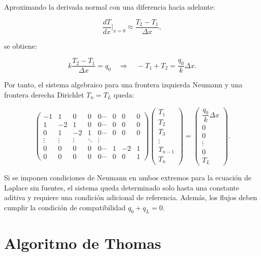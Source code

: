 \documentclass[11pt,a4paper]{article}
\begin{document}
Aproximando la derivada normal con una diferencia hacia adelante:

\begin{equation}
\frac{dT}{dx}\bigg|_{x=0} \approx \frac{T_2-T_1}{\Delta x},
\end{equation}

se obtiene:

\begin{equation}
k\frac{T_2-T_1}{\Delta x}=q_0
\quad \Rightarrow \quad
-T_1+T_2=\frac{q_0}{k}\Delta x.
\end{equation}

Por tanto, el sistema algebraico para una frontera izquierda Neumann y una
frontera derecha Dirichlet $T_n=T_L$ queda:

\begin{equation}
\begin{pmatrix}
-1 & 1 & 0 & 0 & 0  \cdots & 0 & 0 & 0 \\
1 & -2 & 1 & 0 & 0  \cdots & 0 & 0 & 0 \\
0 & 1 & -2 & 1 & 0  \cdots & 0 & 0 & 0 \\
\vdots & \vdots & \vdots & \ddots & \vdots \\
0 & 0 & 0 & 0 & 0  \cdots & 1 & -2 & 1 \\
0 & 0 & 0 & 0 & 0  \cdots & 0 & 0 & 1
\end{pmatrix}
\begin{pmatrix}
T_1 \\
T_2 \\
T_3 \\
\vdots \\
T_{n-1} \\
T_n
\end{pmatrix}
=
\begin{pmatrix}
\dfrac{q_0}{k}\Delta x \\
0 \\
0 \\
\vdots \\
0 \\
T_L
\end{pmatrix}.
\end{equation}

Si se imponen condiciones de Neumann en ambos extremos para la ecuaci\'on de
Laplace sin fuentes, el sistema queda determinado solo hasta una constante
aditiva y requiere una condici\'on adicional de referencia. Adem\'as, los flujos
deben cumplir la condici\'on de compatibilidad $q_0+q_L=0$.

\section{Algoritmo de Thomas}
\end{document}
